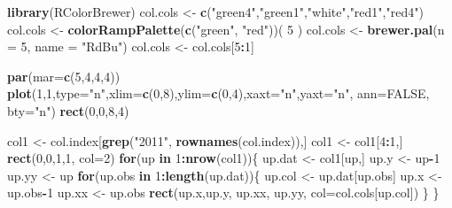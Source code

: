 \documentclass[]{article}
\newenvironment{Shaded}{\begin{snugshade}}{\end{snugshade}}
\newcommand{\KeywordTok}[1]{\textcolor[rgb]{0.13,0.29,0.53}{\textbf{#1}}}
\newcommand{\DataTypeTok}[1]{\textcolor[rgb]{0.13,0.29,0.53}{#1}}
\newcommand{\DecValTok}[1]{\textcolor[rgb]{0.00,0.00,0.81}{#1}}
\newcommand{\StringTok}[1]{\textcolor[rgb]{0.31,0.60,0.02}{#1}}
\newcommand{\OtherTok}[1]{\textcolor[rgb]{0.56,0.35,0.01}{#1}}
\newcommand{\ControlFlowTok}[1]{\textcolor[rgb]{0.13,0.29,0.53}{\textbf{#1}}}
\newcommand{\OperatorTok}[1]{\textcolor[rgb]{0.81,0.36,0.00}{\textbf{#1}}}
\newcommand{\NormalTok}[1]{#1}
\begin{document}
\begin{Shaded}
\begin{Highlighting}[]
\KeywordTok{library}\NormalTok{(RColorBrewer)}
\NormalTok{col.cols <-}\StringTok{ }\KeywordTok{c}\NormalTok{(}\StringTok{"green4"}\NormalTok{,}\StringTok{"green1"}\NormalTok{,}\StringTok{"white"}\NormalTok{,}\StringTok{"red1"}\NormalTok{,}\StringTok{"red4"}\NormalTok{)}
\NormalTok{col.cols <-}\StringTok{ }\KeywordTok{colorRampPalette}\NormalTok{(}\KeywordTok{c}\NormalTok{(}\StringTok{"green"}\NormalTok{, }\StringTok{"red"}\NormalTok{))( }\DecValTok{5}\NormalTok{ )}
\NormalTok{col.cols <-}\StringTok{ }\KeywordTok{brewer.pal}\NormalTok{(}\DataTypeTok{n =} \DecValTok{5}\NormalTok{, }\DataTypeTok{name =} \StringTok{"RdBu"}\NormalTok{)}
\NormalTok{col.cols <-}\StringTok{ }\NormalTok{col.cols[}\DecValTok{5}\OperatorTok{:}\DecValTok{1}\NormalTok{]}

\KeywordTok{par}\NormalTok{(}\DataTypeTok{mar=}\KeywordTok{c}\NormalTok{(}\DecValTok{5}\NormalTok{,}\DecValTok{4}\NormalTok{,}\DecValTok{4}\NormalTok{,}\DecValTok{4}\NormalTok{))}
\KeywordTok{plot}\NormalTok{(}\DecValTok{1}\NormalTok{,}\DecValTok{1}\NormalTok{,}\DataTypeTok{type=}\StringTok{"n"}\NormalTok{,}\DataTypeTok{xlim=}\KeywordTok{c}\NormalTok{(}\DecValTok{0}\NormalTok{,}\DecValTok{8}\NormalTok{),}\DataTypeTok{ylim=}\KeywordTok{c}\NormalTok{(}\DecValTok{0}\NormalTok{,}\DecValTok{4}\NormalTok{),}\DataTypeTok{xaxt=}\StringTok{"n"}\NormalTok{,}\DataTypeTok{yaxt=}\StringTok{"n"}\NormalTok{, }\DataTypeTok{ann=}\OtherTok{FALSE}\NormalTok{, }\DataTypeTok{bty=}\StringTok{"n"}\NormalTok{)}
\KeywordTok{rect}\NormalTok{(}\DecValTok{0}\NormalTok{,}\DecValTok{0}\NormalTok{,}\DecValTok{8}\NormalTok{,}\DecValTok{4}\NormalTok{)}

\NormalTok{col1 <-}\StringTok{ }\NormalTok{col.index[}\KeywordTok{grep}\NormalTok{(}\StringTok{"2011"}\NormalTok{, }\KeywordTok{rownames}\NormalTok{(col.index)),]}
\NormalTok{col1 <-}\StringTok{ }\NormalTok{col1[}\DecValTok{4}\OperatorTok{:}\DecValTok{1}\NormalTok{,]}
\KeywordTok{rect}\NormalTok{(}\DecValTok{0}\NormalTok{,}\DecValTok{0}\NormalTok{,}\DecValTok{1}\NormalTok{,}\DecValTok{1}\NormalTok{, }\DataTypeTok{col=}\DecValTok{2}\NormalTok{)}
\ControlFlowTok{for}\NormalTok{(up }\ControlFlowTok{in} \DecValTok{1}\OperatorTok{:}\KeywordTok{nrow}\NormalTok{(col1))\{}
\NormalTok{  up.dat <-}\StringTok{ }\NormalTok{col1[up,]}
\NormalTok{  up.y <-}\StringTok{ }\NormalTok{up}\OperatorTok{-}\DecValTok{1}
\NormalTok{  up.yy <-}\StringTok{ }\NormalTok{up}
  \ControlFlowTok{for}\NormalTok{(up.obs }\ControlFlowTok{in} \DecValTok{1}\OperatorTok{:}\KeywordTok{length}\NormalTok{(up.dat))\{}
\NormalTok{    up.col <-}\StringTok{ }\NormalTok{up.dat[up.obs]}
\NormalTok{    up.x <-}\StringTok{ }\NormalTok{up.obs}\OperatorTok{-}\DecValTok{1}
\NormalTok{    up.xx <-}\StringTok{  }\NormalTok{up.obs}
    \KeywordTok{rect}\NormalTok{(up.x,up.y, up.xx, up.yy, }\DataTypeTok{col=}\NormalTok{col.cols[up.col])}
\NormalTok{  \}}
\NormalTok{\}}


\end{Highlighting}
\end{Shaded}
\end{document}
